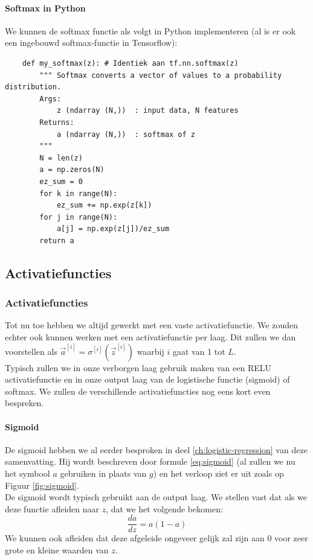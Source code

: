 \paragraph{Softmax in Python}

We kunnen de softmax functie als volgt in Python implementeren (al is er ook een ingebouwd softmax-functie in Tensorflow):

\begin{lstlisting}
	def my_softmax(z): # Identiek aan tf.nn.softmax(z)
	    """ Softmax converts a vector of values to a probability distribution.
	    Args:
	        z (ndarray (N,))  : input data, N features
	    Returns:
	        a (ndarray (N,))  : softmax of z
	    """
	    N = len(z)
	    a = np.zeros(N)
	    ez_sum = 0
	    for k in range(N):                
	        ez_sum += np.exp(z[k])       
	    for j in range(N):                
	        a[j] = np.exp(z[j])/ez_sum   
	    return a
\end{lstlisting}

\subsection{Activatiefuncties}

\subsubsection{Activatiefuncties}

Tot nu toe hebben we altijd gewerkt met een vaste activatiefunctie. We zouden echter ook kunnen werken met een activatiefunctie per laag. Dit zullen we dan voorstellen als $\vec{a}^{[i]} = \sigma^{[i]}(\vec{z}^{[i]})$ waarbij $i$ gaat van 1 tot $L$. \\
\newline
Typisch zullen we in onze verborgen laag gebruik maken van een RELU activatiefunctie en in onze output laag van de logistische functie (sigmoid) of softmax. We zullen de verschillende activatiefuncties nog eens kort even bespreken.

\paragraph{Sigmoid}

De sigmoid hebben we al eerder besproken in deel \ref{ch:logistic-regression} van deze samenvatting. Hij wordt beschreven door formule \ref{eq:sigmoid} (al zullen we nu het symbool $a$ gebruiken in plaats van $g$) en het verloop ziet er uit zoals op Figuur \ref{fig:sigmoid}. \\
\newline
De sigmoid wordt typisch gebruikt aan de output laag. We stellen vast dat als we deze functie afleiden naar $z$, dat we het volgende bekomen:
\begin{equation}
	\frac{da}{dz} = a (1 - a)
\end{equation}
\noindent
We kunnen ook afleiden dat deze afgeleide ongeveer gelijk zal zijn aan 0 voor zeer grote en kleine waarden van $z$. 

